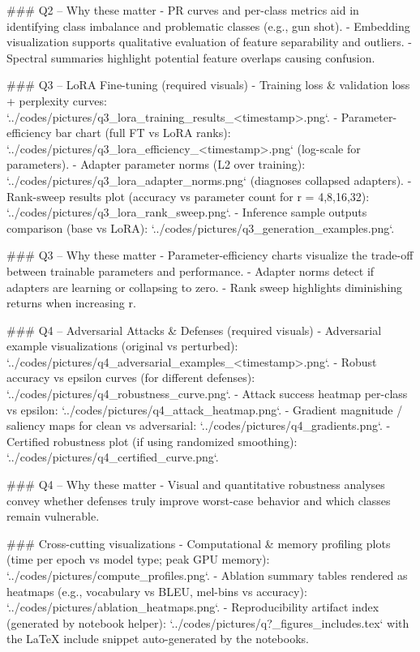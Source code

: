 \documentclass[conference]{IEEEtran}
\begin{document}
### Q2 -- Why these matter
- PR curves and per-class metrics aid in identifying class imbalance and problematic classes (e.g., gun shot).
- Embedding visualization supports qualitative evaluation of feature separability and outliers.
- Spectral summaries highlight potential feature overlaps causing confusion.

### Q3 -- LoRA Fine-tuning (required visuals)
- Training loss & validation loss + perplexity curves: `../codes/pictures/q3_lora_training_results_<timestamp>.png`.
- Parameter-efficiency bar chart (full FT vs LoRA ranks): `../codes/pictures/q3_lora_efficiency_<timestamp>.png` (log-scale for parameters).
- Adapter parameter norms (L2 over training): `../codes/pictures/q3_lora_adapter_norms.png` (diagnoses collapsed adapters).
- Rank-sweep results plot (accuracy vs parameter count for r = 4,8,16,32): `../codes/pictures/q3_lora_rank_sweep.png`.
- Inference sample outputs comparison (base vs LoRA): `../codes/pictures/q3_generation_examples.png`.

### Q3 -- Why these matter
- Parameter-efficiency charts visualize the trade-off between trainable parameters and performance.
- Adapter norms detect if adapters are learning or collapsing to zero.
- Rank sweep highlights diminishing returns when increasing r.

### Q4 -- Adversarial Attacks & Defenses (required visuals)
- Adversarial example visualizations (original vs perturbed): `../codes/pictures/q4_adversarial_examples_<timestamp>.png`.
- Robust accuracy vs epsilon curves (for different defenses): `../codes/pictures/q4_robustness_curve.png`.
- Attack success heatmap per-class vs epsilon: `../codes/pictures/q4_attack_heatmap.png`.
- Gradient magnitude / saliency maps for clean vs adversarial: `../codes/pictures/q4_gradients.png`.
- Certified robustness plot (if using randomized smoothing): `../codes/pictures/q4_certified_curve.png`.

### Q4 -- Why these matter
- Visual and quantitative robustness analyses convey whether defenses truly improve worst-case behavior and which classes remain vulnerable.

### Cross-cutting visualizations
- Computational & memory profiling plots (time per epoch vs model type; peak GPU memory): `../codes/pictures/compute_profiles.png`.
- Ablation summary tables rendered as heatmaps (e.g., vocabulary vs BLEU, mel-bins vs accuracy): `../codes/pictures/ablation_heatmaps.png`.
- Reproducibility artifact index (generated by notebook helper): `../codes/pictures/q?_figures_includes.tex` with the LaTeX include snippet auto-generated by the notebooks.
\end{document}
